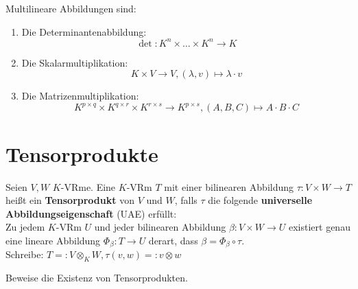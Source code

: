 \documentclass[parskip,a4paper,twoside,DIV15,BCOR12mm]{scrbook}
\begin{document}
\begin{example}
Multilineare Abbildungen sind:
\begin{enumerate}
\item Die Determinantenabbildung:
\[\det:K^n\times\ldots\times K^n\to K\]
\item Die Skalarmultiplikation:
\[K\times V\to V,(\lambda,v)\mapsto \lambda\cdot v\]
\item Die Matrizenmultiplikation:
\[K^{p\times q}\times K^{q\times r}\times K^{r\times s}\to K^{p\times s},(A,B,C)\mapsto A\cdot B\cdot C\]
\end{enumerate}
\end{example}

\section{Tensorprodukte}
\begin{definition}
Seien $V,W$ $K$-VRme. Eine $K$-VRm $T$ mit einer bilinearen Abbildung $\tau:V\times W\to T$
heißt ein \textbf{Tensorprodukt} von $V$ und $W$, falls $\tau$ die folgende 
\textbf{universelle Abbildungseigenschaft} (UAE) erfüllt:\\
Zu jedem $K$-VRm $U$ und jeder bilinearen Abbildung $\beta:V\times W\to U$ existiert
genau eine lineare Abbildung $\Phi_\beta:T\to U$ derart, dass $\beta=\Phi_\beta\circ \tau$.\\
Schreibe: $T=:V\otimes_K W,\tau(v,w)=:v\otimes w$
\end{definition}

\begin{comment}
\begin{enumerate}
\item Falls $T$ existiert, so hat man eine Bijektion:
\[\Bil(V\times W,U)\stackrel{\sim}{\to}\Hom(T,U),\beta\mapsto\Phi_\beta\]
\item Sind $(T_1,\tau_1),(T_2,\tau_2)$ Tensorprodukte von $V$ und $W$, so existiert genau 
ein Isomorphismus $\Phi:T_1\to T_2$ mit $\tau_2=\Phi\circ\tau_1$.
\end{enumerate}
\end{comment}

\begin{task}
Beweise die Existenz von Tensorprodukten.
\end{task}
\end{document}
